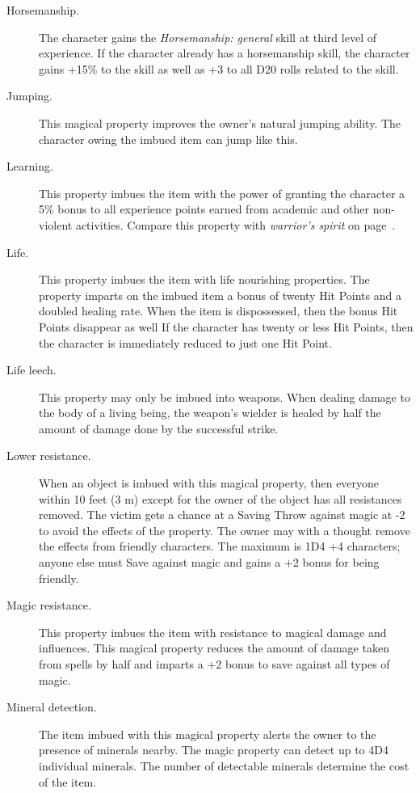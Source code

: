 \begin{description}
\item[Horsemanship.]
The character gains the \emph
{Horsemanship: general} skill at
third level of experience.
If the character already has a
horsemanship skill,
the character gains +15\% to the
skill as well as +3 to all D20 rolls
related to the skill.

\item[Jumping.]
This magical property improves the
owner's natural jumping ability.
The character owing the imbued
item can jump like this.

\item[Learning.]\label{mp:learning}
This property imbues the item with the power of granting the character a 5\% bonus to
all experience points earned from academic and other non-violent activities.
Compare this property with \emph{warrior's spirit} on page~\pageref{mp:warriorspirit}.

\item[Life.]
This property imbues the item with life nourishing properties.
The property imparts on the imbued item
a bonus of twenty Hit Points and
a doubled healing rate.
When the item is dispossessed, then the bonus Hit Points
disappear as well
If the character 
has twenty or less Hit Points,
then the character is immediately reduced to just one Hit Point.

\item[Life leech.]
This property may only be imbued into weapons.
When dealing damage to the body of a living being,
the weapon's wielder is healed by half the amount of
damage done by the successful strike.

\item[Lower resistance.]
When an object is imbued with this magical
property, then everyone within 10 feet
(3 m) except for the owner of the object
has all resistances removed.
The victim gets a chance at a Saving
Throw against magic at -2 to avoid the
effects of the property.
The owner may with a thought remove the
effects from friendly characters.
The maximum is 1D4 +4 characters; anyone
else must Save against magic and gains a
+2 bonus for being friendly.

\item[Magic resistance.]
This property imbues the item with resistance to magical damage and influences.
This magical property reduces the amount of damage taken from spells by half and
imparts a +2 bonus to save against all types of magic.

\item[Mineral detection.] The item
imbued with this magical property alerts
the owner to the presence of minerals
nearby.
The magic property can detect up to
4D4 individual minerals.
The number of detectable minerals
determine the cost of the item.


\end{description}
